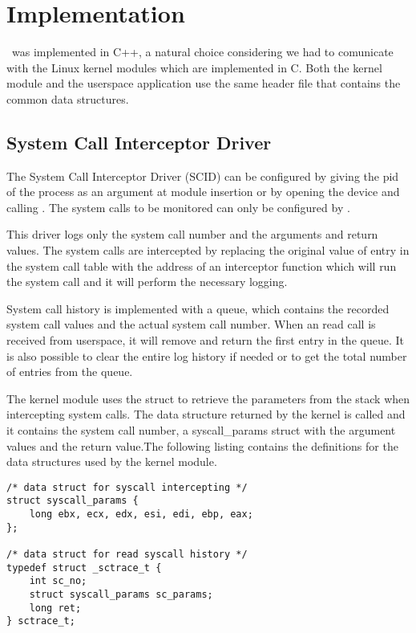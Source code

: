 \chapter{Implementation}
\label{chapter:fourth-chapter}

\project\ was implemented in C++, a natural choice considering we had to comunicate with the Linux kernel modules which are implemented in C. Both the kernel module and the userspace application use the same header file that contains the common data structures.

\section{System Call Interceptor Driver}
\label{fourth:design}

The System Call Interceptor Driver (SCID) can be configured by giving the pid of the process as an argument at module insertion or by opening the device and calling . The system calls to be monitored can only be configured by .

This driver logs only the system call number and the arguments and return values. The system calls are intercepted by replacing the original value of entry in the system call table with the address of an interceptor function which will run the system call and it will perform the necessary logging.

System call history is implemented with a queue, which contains the recorded system call values and the actual system call number. When an  read call is received from userspace, it will remove and return the first entry in the queue. It is also possible to clear the entire log history if needed or to get the total number of entries from the queue.

The kernel module uses the  struct to retrieve the parameters from the stack when intercepting system calls. The data structure returned by the kernel is called  and it contains the system call number, a syscall_params struct with the argument values and the return value.The following listing contains the definitions for the data structures used by the kernel module.

\lstset{language=C,caption=SCID data structures,label=lst:scid-struct}
\begin{lstlisting}
/* data struct for syscall intercepting */
struct syscall_params {
	long ebx, ecx, edx, esi, edi, ebp, eax;
};

/* data struct for read syscall history */
typedef struct _sctrace_t {
	int sc_no;
	struct syscall_params sc_params;
	long ret;
} sctrace_t;
\end{lstlisting}


